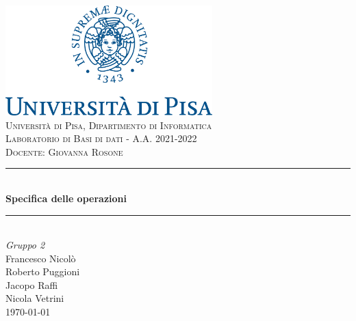 \documentclass[a4paper,11pt]{article}
\newcommand{\HRule}{\rule{\linewidth}{0.5mm}} 	%
\begin{document}
\begin{titlepage}
\center
\includegraphics[width=0.6\textwidth]{img/unipi-logo.png}\\[1cm]

\textsc{\LARGE Università di Pisa, Dipartimento di Informatica}\\[1cm]

\textsc{\Large Laboratorio di Basi di dati - A.A. 2021-2022}\\[0.2cm]
\textsc{\large Docente: Giovanna Rosone}\\[1cm]

\HRule \\[0.8cm]
{ \huge \bfseries Specifica delle operazioni}\\[0.7cm]
\HRule \\[2cm]

\Huge \emph{Gruppo 2}\\[0.5cm]
\large Francesco Nicolò\\Roberto Puggioni\\Jacopo Raffi\\Nicola Vetrini\\[1.5cm]
{\large \today}\\[5cm]

\vfill
\end{titlepage}

\clearpage
\tableofcontents
\clearpage
\end{document}
